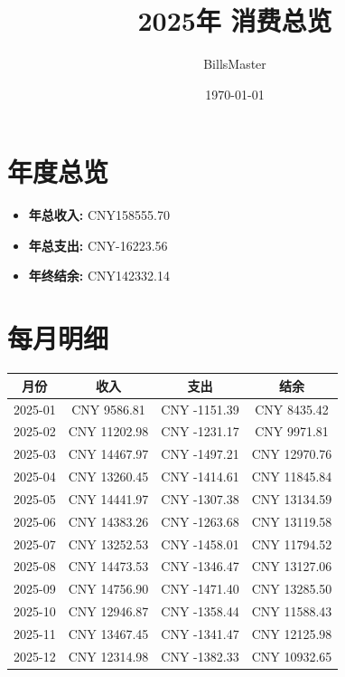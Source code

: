 \documentclass[12pt]{article}
\title{2025年 消费总览}
\author{BillsMaster}
\date{\today}
\begin{document}
\maketitle

\section*{年度总览}
\begin{itemize}
    \item \textbf{年总收入:} CNY158555.70
    \item \textbf{年总支出:} CNY-16223.56
    \item \textbf{年终结余:} CNY142332.14
\end{itemize}

\section*{每月明细}
\begin{table}[h]
\centering
\begin{tabular}{|c|c|c|c|}
\hline
\textbf{月份} & \textbf{收入} & \textbf{支出} & \textbf{结余} \\
\hline
2025-01 & CNY 9586.81 & CNY -1151.39 & CNY 8435.42 \\
\hline
2025-02 & CNY 11202.98 & CNY -1231.17 & CNY 9971.81 \\
\hline
2025-03 & CNY 14467.97 & CNY -1497.21 & CNY 12970.76 \\
\hline
2025-04 & CNY 13260.45 & CNY -1414.61 & CNY 11845.84 \\
\hline
2025-05 & CNY 14441.97 & CNY -1307.38 & CNY 13134.59 \\
\hline
2025-06 & CNY 14383.26 & CNY -1263.68 & CNY 13119.58 \\
\hline
2025-07 & CNY 13252.53 & CNY -1458.01 & CNY 11794.52 \\
\hline
2025-08 & CNY 14473.53 & CNY -1346.47 & CNY 13127.06 \\
\hline
2025-09 & CNY 14756.90 & CNY -1471.40 & CNY 13285.50 \\
\hline
2025-10 & CNY 12946.87 & CNY -1358.44 & CNY 11588.43 \\
\hline
2025-11 & CNY 13467.45 & CNY -1341.47 & CNY 12125.98 \\
\hline
2025-12 & CNY 12314.98 & CNY -1382.33 & CNY 10932.65 \\
\hline
\end{tabular}
\end{table}
\end{document}
